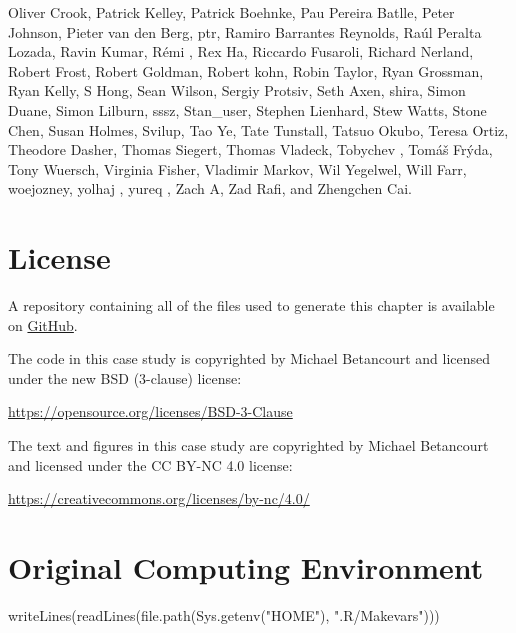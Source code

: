\documentclass[
  letterpaper,
  DIV=11,
  numbers=noendperiod]{scrartcl}
\newenvironment{Shaded}{\begin{snugshade}}{\end{snugshade}}
\newcommand{\FunctionTok}[1]{\textcolor[rgb]{0.28,0.35,0.67}{#1}}
\newcommand{\NormalTok}[1]{\textcolor[rgb]{0.00,0.23,0.31}{#1}}
\newcommand{\StringTok}[1]{\textcolor[rgb]{0.13,0.47,0.30}{#1}}
\begin{document}
Oliver Crook, Patrick Kelley, Patrick Boehnke, Pau Pereira Batlle, Peter
Johnson, Pieter van den Berg, ptr, Ramiro Barrantes Reynolds, Raúl
Peralta Lozada, Ravin Kumar, Rémi , Rex Ha, Riccardo Fusaroli, Richard
Nerland, Robert Frost, Robert Goldman, Robert kohn, Robin Taylor, Ryan
Grossman, Ryan Kelly, S Hong, Sean Wilson, Sergiy Protsiv, Seth Axen,
shira, Simon Duane, Simon Lilburn, sssz, Stan\_user, Stephen Lienhard,
Stew Watts, Stone Chen, Susan Holmes, Svilup, Tao Ye, Tate Tunstall,
Tatsuo Okubo, Teresa Ortiz, Theodore Dasher, Thomas Siegert, Thomas
Vladeck, Tobychev , Tomáš Frýda, Tony Wuersch, Virginia Fisher, Vladimir
Markov, Wil Yegelwel, Will Farr, woejozney, yolhaj , yureq , Zach A, Zad
Rafi, and Zhengchen Cai.

\section*{License}\label{license}

A repository containing all of the files used to generate this chapter
is available on
\href{https://github.com/betanalpha/quarto_chapters/tree/main/case_studies/customer_conversion}{GitHub}.

The code in this case study is copyrighted by Michael Betancourt and
licensed under the new BSD (3-clause) license:

\url{https://opensource.org/licenses/BSD-3-Clause}

The text and figures in this case study are copyrighted by Michael
Betancourt and licensed under the CC BY-NC 4.0 license:

\url{https://creativecommons.org/licenses/by-nc/4.0/}

\section*{Original Computing
Environment}\label{original-computing-environment}

\begin{Shaded}
\begin{Highlighting}[]
\FunctionTok{writeLines}\NormalTok{(}\FunctionTok{readLines}\NormalTok{(}\FunctionTok{file.path}\NormalTok{(}\FunctionTok{Sys.getenv}\NormalTok{(}\StringTok{"HOME"}\NormalTok{), }\StringTok{".R/Makevars"}\NormalTok{)))}
\end{Highlighting}
\end{Shaded}
\end{document}
